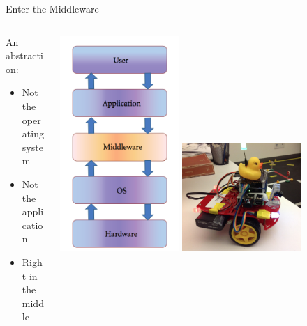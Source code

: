 \documentclass[aspectratio=43]{beamer}
\begin{document}
\begin{frame}{Enter the Middleware}
\begin{columns}
	\begin{column}{0.55\textwidth}
An abstraction:
		\begin{itemize}
			\item Not the operating system
                        \item Not the application
                        \item Right in the middle
		\end{itemize} 
        \end{column} 
        \begin{column}{0.45\textwidth} 
          \centering 
          \includegraphics[width=0.4\textwidth]{fig/layers.png} 
          \centering 
          \includegraphics[width=0.4\textwidth]{fig/mercedes.jpg} 

        \end{column}
\end{columns}

\end{frame}
\end{document}
